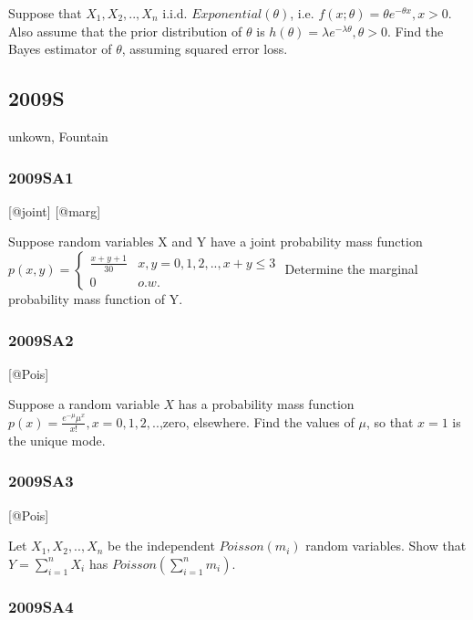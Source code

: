 \documentclass[6pt,twocolumn,Portrait]{article}
\begin{document}
Suppose that \(X_1,X_2,..,X_n\) i.i.d. \(Exponential(\theta)\), i.e.
\(f(x;\theta)=\theta e^{-\theta x},x>0\). Also assume that the prior
distribution of \(\theta\) is
\(h(\theta)=\lambda e^{-\lambda\theta},\theta>0\). Find the Bayes
estimator of \(\theta\), assuming squared error loss.

\hypertarget{s-3}{%
\subsection{2009S}\label{s-3}}

unkown, Fountain

\hypertarget{sa1}{%
\subsubsection{2009SA1}\label{sa1}}

{[}@joint{]} {[}@marg{]}

Suppose random variables X and Y have a joint probability mass function
\(p(x,y)=\begin{cases}\frac{x+y+1}{30}& x,y=0,1,2,..,x+y\le3\\0& o.w.\end{cases}\)
Determine the marginal probability mass function of Y.

\hypertarget{sa2}{%
\subsubsection{2009SA2}\label{sa2}}

{[}@Pois{]}

Suppose a random variable \(X\) has a probability mass function
\(p(x)=\frac{e^{-\mu}\mu^x}{x!},x=0,1,2,..\),zero, elsewhere. Find the
values of \(\mu\), so that \(x=1\) is the unique mode.

\hypertarget{sa3}{%
\subsubsection{2009SA3}\label{sa3}}

{[}@Pois{]}

Let \(X_1,X_2,..,X_n\) be the independent \(Poisson(m_i)\) random
variables. Show that \(Y=\sum_{i=1}^n X_i\) has
\(Poisson(\sum_{i=1}^n m_i)\).

\hypertarget{sa4}{%
\subsubsection{2009SA4}\label{sa4}}
\end{document}
